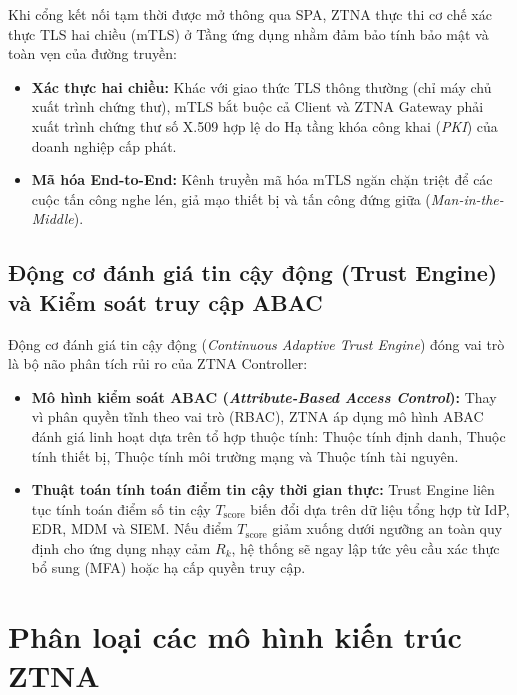 Khi cổng kết nối tạm thời được mở thông qua SPA, ZTNA thực thi cơ chế xác thực TLS hai chiều (mTLS) ở Tầng ứng dụng nhằm đảm bảo tính bảo mật và toàn vẹn của đường truyền:

\begin{itemize}
    \item \textbf{Xác thực hai chiều:} Khác với giao thức TLS thông thường (chỉ máy chủ xuất trình chứng thư), mTLS bắt buộc cả Client và ZTNA Gateway phải xuất trình chứng thư số X.509 hợp lệ do Hạ tầng khóa công khai (\textit{PKI}) của doanh nghiệp cấp phát.
    \item \textbf{Mã hóa End-to-End:} Kênh truyền mã hóa mTLS ngăn chặn triệt để các cuộc tấn công nghe lén, giả mạo thiết bị và tấn công đứng giữa (\textit{Man-in-the-Middle}).
\end{itemize}

\subsection{Động cơ đánh giá tin cậy động (Trust Engine) và Kiểm soát truy cập ABAC}
\label{subsec:3_2_4}

Động cơ đánh giá tin cậy động (\textit{Continuous Adaptive Trust Engine}) đóng vai trò là bộ não phân tích rủi ro của ZTNA Controller:

\begin{itemize}
    \item \textbf{Mô hình kiểm soát ABAC (\textit{Attribute-Based Access Control}):} Thay vì phân quyền tĩnh theo vai trò (RBAC), ZTNA áp dụng mô hình ABAC đánh giá linh hoạt dựa trên tổ hợp thuộc tính: Thuộc tính định danh, Thuộc tính thiết bị, Thuộc tính môi trường mạng và Thuộc tính tài nguyên.
    \item \textbf{Thuật toán tính toán điểm tin cậy thời gian thực:} Trust Engine liên tục tính toán điểm số tin cậy $T_{\text{score}}$ biến đổi dựa trên dữ liệu tổng hợp từ IdP, EDR, MDM và SIEM. Nếu điểm $T_{\text{score}}$ giảm xuống dưới ngưỡng an toàn quy định cho ứng dụng nhạy cảm $R_k$, hệ thống sẽ ngay lập tức yêu cầu xác thực bổ sung (MFA) hoặc hạ cấp quyền truy cập.
\end{itemize}

\section{Phân loại các mô hình kiến trúc ZTNA}
\label{sec:3_3}

